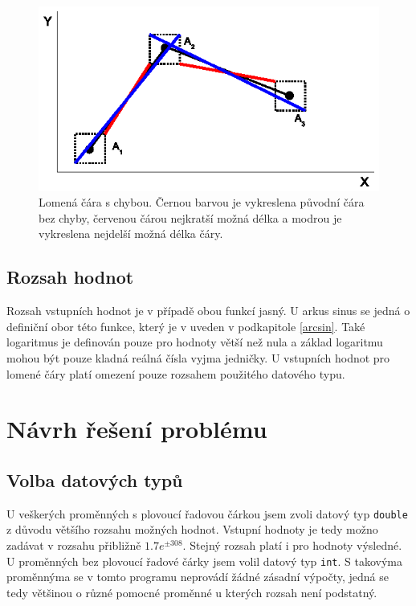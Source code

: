 \documentclass[12pt,a4paper,titlepage,final]{article}
\begin{document}
\begin{figure}
  \centering
  \includegraphics{img/lomcara_ch.eps}
  \caption{Lomená čára s chybou. Černou barvou je vykreslena původní čára bez
           chyby, červenou čárou nejkratší možná délka a modrou je vykreslena
           nejdelší možná délka čáry.}
  \label{fig:lomena_cara_ch}
\end{figure}

\subsection{Rozsah hodnot}

Rozsah vstupních hodnot je v případě obou funkcí jasný. U arkus sinus
se jedná o definiční obor této funkce, který je v uveden v podkapitole
\ref{arcsin}. Také logaritmus je definován pouze pro hodnoty větší než nula a
základ logaritmu mohou být pouze kladná reálná čísla vyjma jedničky. U vstupních
hodnot pro lomené čáry platí omezení pouze rozsahem použitého datového typu.

\newpage
\section{Návrh řešení problému} \label{navrh}


\subsection{Volba datových typů}

U veškerých proměnných s plovoucí řadovou čárkou jsem zvoli datový typ \texttt{double}
z důvodu většího rozsahu možných hodnot. Vstupní hodnoty je tedy možno zadávat
v rozsahu přibližně $1.7e^{\pm308}$. Stejný rozsah platí i pro hodnoty výsledné.
U proměnných bez plovoucí řadové čárky jsem volil datový typ \texttt{int}. S takovýma
proměnnýma se v tomto programu neprovádí žádné zásadní výpočty, jedná se tedy
většinou o různé pomocné proměnné u kterých rozsah není podstatný.
\end{document}
